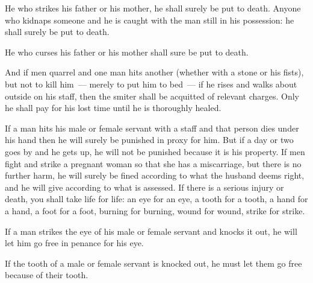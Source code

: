 \begin{inparaenum}
   He who strikes his father or his mother, he shall surely be put to death.%
   Anyone who kidnaps someone and he is caught with the man still in his possession: he shall surely be put to death.%

   He who curses his father or his mother shall sure be put to death.%

   And if men quarrel and one man hits another (whether with a stone or his fists), but not to kill him~--- merely to put him to bed~---%
   if he rises and walks about outside on his staff, then the smiter shall be acquitted of relevant charges. Only he shall pay for his lost time until he is thoroughly healed.%

   If a man hits his male or female servant with a staff and that person dies under his hand then he will surely be punished in proxy for him.%
   But if a day or two goes by and he gets up, he will not be punished because it is his property.%
   If men fight and strike a pregnant woman so that she has a miscarriage, but there is no further harm, he will surely be fined according to what the husband deems right, and he will give according to what is assessed.%
   If there is a serious injury or death, you shall take life for life:%
   an eye for an eye, a tooth for a tooth, a hand for a hand, a foot for a foot,%
   burning for burning, wound for wound, strike for strike.%

   If a man strikes the eye of his male or female servant and knocks it out, he will let him go free in penance for his eye.%

   If the tooth of a male or female servant is knocked out, he must let them go free because of their tooth.%


\end{inparaenum}
